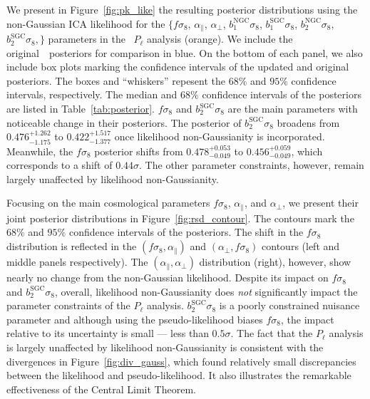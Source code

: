 \documentclass[12pt, letterpaper, preprint]{aastex}
\newcommand{\Beut}{\citetalias{beutler2017}}
\begin{document}
We present in Figure~\ref{fig:pk_like} the resulting posterior 
distributions using the non-Gaussian ICA likelihood for the 
$\big \{f \sigma_8$, $\alpha_\parallel$, $\alpha_\perp$, 
$b_1^\mathrm{NGC} \sigma_8$, $b_1^\mathrm{SGC} \sigma_8$, 
$b_2^\mathrm{NGC} \sigma_8$, $b_2^\mathrm{SGC} \sigma_8,\big \}$
parameters in the \Beut~$P_\ell$ analysis (orange). We include 
the original~\Beut~posteriors for comparison in blue. On the 
bottom of each panel, we also include box plots marking the 
confidence intervals of the updated and original posteriors. 
The boxes and ``whiskers'' repesent the $68\%$ and $95\%$ 
confidence intervals, respectively. The median and $68\%$ 
confidence intervals of the posteriors are listed in Table~\ref{tab:posterior}.
$f \sigma_8$ and $b_2^\mathrm{SGC} \sigma_8$ are the main parameters with 
noticeable change in their posteriors. The posterior of $b_2^\mathrm{SGC} \sigma_8$
broadens from $0.476^{+1.262}_{-1.175}$ to $0.422^{+1.517}_{-1.377}$ once likelihood 
non-Gaussianity is incorporated. Meanwhile, the $f \sigma_8$ posterior
shifts from $0.478^{+0.053}_{-0.049}$ to $0.456^{+0.059}_{-0.049}$, which 
corresponds to a  shift of $0.44 \sigma$. The other parameter constraints, 
however, remain largely unaffected by likelihood non-Gaussianity. 

Focusing on the main cosmological parameters $f \sigma_8$, 
$\alpha_\parallel$, and $\alpha_\perp$, we present their 
joint posterior distributions in Figure~\ref{fig:rsd_contour}.  
The contours mark the $68\%$ and $95\%$ confidence intervals
of the posteriors. The shift in the $f \sigma_8$ distribution 
is reflected in the
$(f\sigma_8, \alpha_\parallel)$ and $(\alpha_\perp, f\sigma_8)$ 
contours (left and middle panels respectively). The 
$(\alpha_\parallel, \alpha_\perp)$ distribution (right), however, show nearly 
no change from the non-Gaussian likelihood. %
Despite its impact on $f \sigma_8$ and $b_2^\mathrm{SGC} \sigma_8$, 
overall, likelihood non-Gaussianity does \emph{not}
significantly impact the parameter constraints of the $P_\ell$ 
analysis. $b_2^\mathrm{SGC} \sigma_8$ is a poorly constrained nuisance 
parameter and although using the pseudo-likelihood biases $f \sigma_8$, 
the impact relative to its uncertainty is small --- less than $0.5 \sigma$. 
The fact that the $P_\ell$ analysis is largely unaffected by likelihood 
non-Gaussianity is consistent with the divergences in 
Figure~\ref{fig:div_gauss}, which found relatively small discrepancies 
between the likelihood and pseudo-likelihood. It also illustrates
the remarkable effectiveness of the Central Limit Theorem. %
\end{document}
